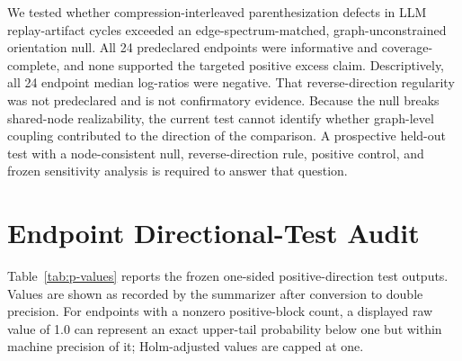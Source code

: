 \documentclass[11pt]{article}
\begin{document}
We tested whether compression-interleaved parenthesization defects in LLM
replay-artifact cycles exceeded an edge-spectrum-matched,
graph-unconstrained orientation null. All 24 predeclared endpoints were
informative and coverage-complete, and none supported the targeted positive
excess claim. Descriptively, all 24 endpoint median log-ratios were negative.
That reverse-direction regularity was not predeclared and is not confirmatory
evidence. Because the null breaks shared-node realizability, the current test
cannot identify whether graph-level coupling contributed to the direction of
the comparison. A prospective held-out test with a node-consistent null,
reverse-direction rule, positive control, and frozen sensitivity analysis is
required to answer that question.

\appendix

\section{Endpoint Directional-Test Audit}
\label{app:p-values}

Table~\ref{tab:p-values} reports the frozen one-sided positive-direction test
outputs. Values are shown as recorded by the summarizer after conversion to
double precision. For endpoints with a nonzero positive-block count, a
displayed raw value of 1.0 can represent an exact upper-tail probability below
one but within machine precision of it; Holm-adjusted values are capped at one.
\end{document}
